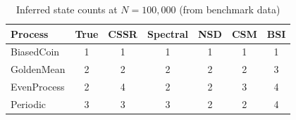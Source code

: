\begin{table}[h]
\centering
\caption{Inferred state counts at $N = 100{,}000$ (from benchmark data)}
\label{tab:state-counts}
\begin{tabular}{lcccccc}
\toprule
Process & True & CSSR & Spectral & NSD & CSM & BSI \\
\midrule
BiasedCoin & 1 & 1 & 1 & 1 & 1 & 1 \\
GoldenMean & 2 & 2 & 2 & 2 & 2 & 3 \\
EvenProcess & 2 & 4 & 2 & 2 & 3 & 4 \\
Periodic & 3 & 3 & 3 & 2 & 2 & 4 \\
\bottomrule
\end{tabular}
\end{table}
